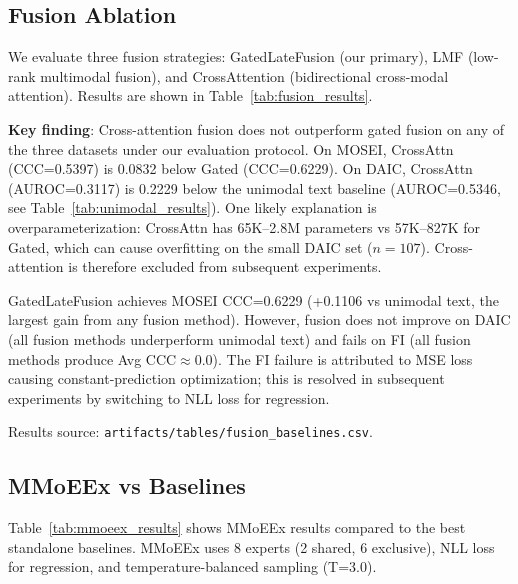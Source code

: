 \documentclass[12pt,oneside]{book}
\begin{document}
\subsection{Fusion Ablation}
\label{sec:fusion_ablation}



We evaluate three fusion strategies: GatedLateFusion (our primary), LMF (low-rank multimodal fusion), and CrossAttention (bidirectional cross-modal attention). Results are shown in Table~\ref{tab:fusion_results}.

\textbf{Key finding}: Cross-attention fusion does not outperform gated fusion on any of the three datasets under our evaluation protocol. On MOSEI, CrossAttn (CCC=0.5397) is 0.0832 below Gated (CCC=0.6229). On DAIC, CrossAttn (AUROC=0.3117) is 0.2229 below the unimodal text baseline (AUROC=0.5346, see Table~\ref{tab:unimodal_results}). One likely explanation is overparameterization: CrossAttn has 65K--2.8M parameters vs 57K--827K for Gated, which can cause overfitting on the small DAIC set ($n=107$). Cross-attention is therefore excluded from subsequent experiments.

GatedLateFusion achieves MOSEI CCC=0.6229 (+0.1106 vs unimodal text, the largest gain from any fusion method). However, fusion does not improve on DAIC (all fusion methods underperform unimodal text) and fails on FI (all fusion methods produce Avg CCC$\approx$0.0). The FI failure is attributed to MSE loss causing constant-prediction optimization; this is resolved in subsequent experiments by switching to NLL loss for regression.

Results source: \texttt{artifacts/tables/fusion\_baselines.csv}.

\subsection{MMoEEx vs Baselines}
\label{sec:mmoeex_results}



Table~\ref{tab:mmoeex_results} shows MMoEEx results compared to the best standalone baselines. MMoEEx uses 8 experts (2 shared, 6 exclusive), NLL loss for regression, and temperature-balanced sampling (T=3.0).
\end{document}
